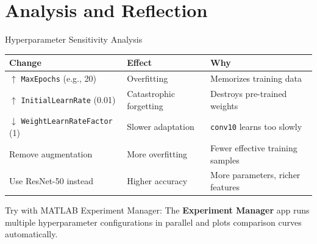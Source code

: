 \documentclass[aspectratio=169,xcolor=dvipsnames]{beamer}
\begin{document}
\section{Analysis and Reflection}

\begin{frame}{Hyperparameter Sensitivity Analysis}
    \begin{tabular}{lll}
        \toprule
        \footnotesize
        \textbf{Change} & \textbf{Effect} & \textbf{Why} \\
        \midrule
        $\uparrow$ \texttt{MaxEpochs} (e.g., 20) & Overfitting & Memorizes training data \\
        $\uparrow$ \texttt{InitialLearnRate} (0.01) & Catastrophic forgetting & Destroys pre-trained weights \\
        $\downarrow$ \texttt{WeightLearnRateFactor} (1) & Slower adaptation & \texttt{conv10} learns too slowly \\
        Remove augmentation & More overfitting & Fewer effective training samples \\
        Use ResNet-50 instead & Higher accuracy & More parameters, richer features \\
        \bottomrule
    \end{tabular}
    \vspace{0.3cm}
    \begin{exampleblock}{Try with MATLAB Experiment Manager:}
        The \textbf{Experiment Manager} app runs multiple hyperparameter configurations in parallel and plots comparison curves automatically.
    \end{exampleblock}
\end{frame}
\end{document}
